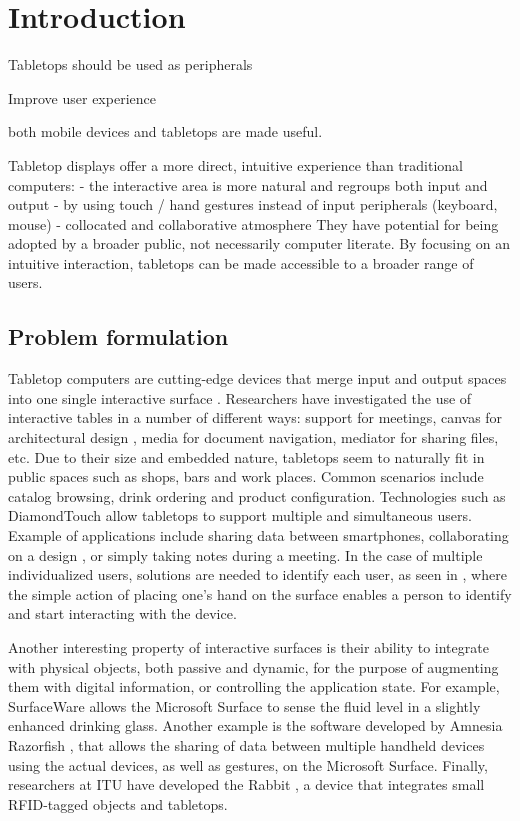 

\chapter{Introduction}

Tabletops should be used as peripherals

Improve user experience

both mobile devices and tabletops are made useful.

Tabletop displays offer a more direct, intuitive experience than traditional computers:
- the interactive area is more natural and regroups both input and output
- by using touch / hand gestures instead of input peripherals (keyboard, mouse)
- collocated and collaborative atmosphere
They have potential for being adopted by a broader public, not necessarily computer literate.
By focusing on an intuitive interaction, tabletops can be made accessible to a broader range of users.

\section{Problem formulation}

Tabletop computers are cutting-edge devices that merge input and output spaces into one single interactive surface \cite{Wellner:1993:digitaldesk}.
Researchers have investigated the use of interactive tables in a number of different ways: support for meetings, canvas for architectural design \cite{Clifton:2010:sketchtop}, media for document navigation, mediator for sharing files, etc.
Due to their size and embedded nature, tabletops seem to naturally fit in public spaces such as shops, bars and work places.
Common scenarios include catalog browsing, drink ordering and product configuration.
Technologies such as DiamondTouch \cite{Dietz:2001:diamondtouch} allow tabletops to support multiple and simultaneous users. Example of applications include sharing data between smartphones, collaborating on a design \cite{Hunter:2011:memtable}, or simply taking notes during a meeting.
In the case of multiple individualized users, solutions are needed to identify each user, as seen in \cite{Schmidt:2010:handsdown}, where the simple action of placing one's hand on the surface enables a person to identify and start interacting with the device.

Another interesting property of interactive surfaces is their ability to integrate with physical objects, both passive and dynamic, for the purpose of augmenting them with digital information, or controlling the application state.
For example, SurfaceWare \cite{Dietz:2009:surfaceware} allows the Microsoft Surface to sense the fluid level in a slightly enhanced drinking glass.
Another example is the software developed by Amnesia Razorfish \cite{amnesia}, that allows the sharing of data between multiple handheld devices using the actual devices, as well as gestures, on the Microsoft Surface.
Finally, researchers at ITU have developed the Rabbit \cite{Hincapie:2011:rabbit}, a device that integrates small RFID-tagged objects and tabletops.

